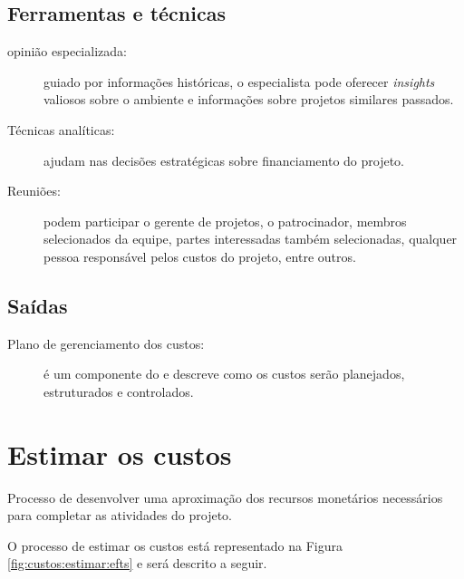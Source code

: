 \section{Ferramentas e técnicas}

\begin{description}

	\item[opinião especializada:] guiado por informações históricas, o especialista pode oferecer \textit{insights} valiosos sobre o ambiente e informações sobre projetos similares passados.

	\item[Técnicas analíticas:] ajudam nas decisões estratégicas sobre financiamento do projeto.
	
	\item[Reuniões:] podem participar o gerente de projetos, o patrocinador, membros selecionados da equipe, partes interessadas também selecionadas, qualquer pessoa responsável pelos custos do projeto, entre outros.
	
\end{description}

\section{Saídas}

\begin{description}
	
	\item[Plano de gerenciamento dos custos:] é um componente do \planproj e descreve como os custos serão planejados, estruturados e controlados.

\end{description}

\chapter{Estimar os custos}

Processo de desenvolver uma aproximação dos recursos monetários necessários para completar as atividades do projeto. 

O processo de estimar os custos está representado na Figura \ref{fig:custos:estimar:efts} e será descrito a seguir.

